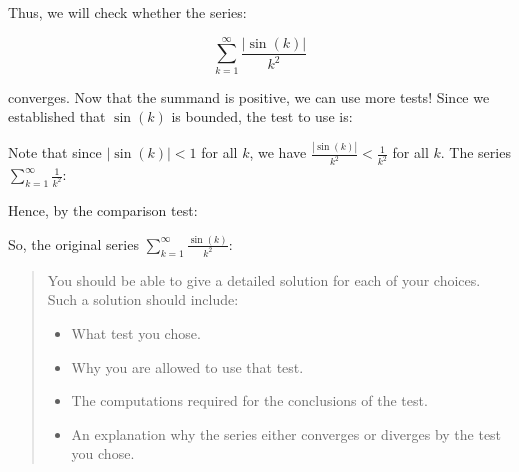 \documentclass{ximera}
\begin{document}
\begin{exercise}
\begin{hint}
\begin{question}
\begin{multipleChoice}
\end{multipleChoice} 

Thus, we will check whether the series:

\[
\sum_{k=1}^{\infty} \frac{|\sin(k)|}{k^2}
\]

converges.  Now that the summand is positive, we can use more tests!  Since we established that $\sin(k)$ is bounded, the test to use is:
\begin{multipleChoice}
\end{multipleChoice}

Note that since $|\sin(k)|<1$ for all $k$, we have $\frac{|\sin(k)|}{k^2}<\frac{1}{k^2}$ for all $k$.  The series $\sum_{k=1}^{\infty} \frac{1}{k^2}$:

\begin{multipleChoice}
\end{multipleChoice}

Hence, by the comparison test:

\begin{multipleChoice}
\end{multipleChoice}

So, the original series $\sum_{k=1}^{\infty} \frac{\sin(k)}{k^2}$:
\begin{multipleChoice}
\end{multipleChoice}


\end{question}
\end{hint}







\begin{quote}
You should be able to give a detailed solution for each of your choices.  Such a solution should include:

\begin{itemize}
\item What test you chose.
\item Why you are allowed to use that test.
\item The computations required for the conclusions of the test.
\item An explanation why the series either converges or diverges by the test you chose.
\end{itemize}

\end{quote}


\end{exercise}
\end{document}
